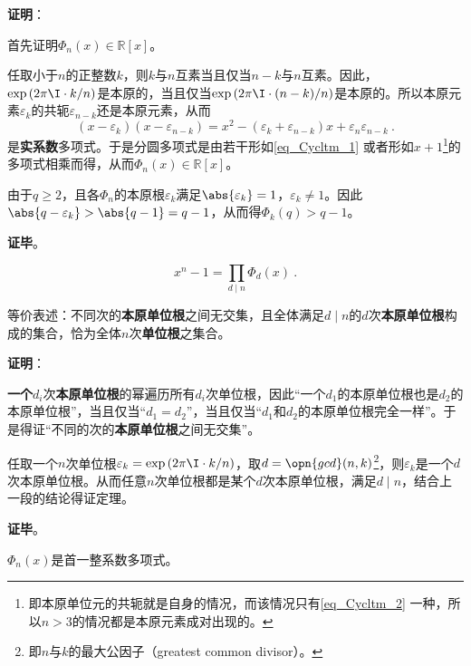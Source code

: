 \textbf{证明}：

首先证明$\Phi_n(x)\in\mathbb{R}[x]$。

任取小于$n$的正整数$k$，则$k$与$n$互素当且仅当$n-k$与$n$互素。因此，$\exp{(2\pi\I\cdot  k/n)}$是本原的，当且仅当$\exp{(2\pi\I\cdot  (n-k)/n)}$是本原的。所以本原元素$\varepsilon_k$的共轭$\varepsilon_{n-k}$还是本原元素，从而
\begin{equation}\label{eq_Cycltm_1}
(x-\varepsilon_k)(x-\varepsilon_{n-k})=x^2-(\varepsilon_k+\varepsilon_{n-k})x+\varepsilon_n\varepsilon_{n-k}~.
\end{equation}
是\textbf{实系数}多项式。于是分圆多项式是由若干形如\autoref{eq_Cycltm_1} 或者形如$x+1$\footnote{即本原单位元的共轭就是自身的情况，而该情况只有\autoref{eq_Cycltm_2} 一种，所以$n>3$的情况都是本原元素成对出现的。}的多项式相乘而得，从而$\Phi_n(x)\in\mathbb{R}[x]$。

由于$q\geq 2$，且各$\Phi_n$的本原根$\varepsilon_k$满足$\abs{\varepsilon_k}=1$，$\varepsilon_k\neq 1$。因此$\abs{q-\varepsilon_k}>\abs{q-1}=q-1$，从而得$\Phi_k(q)>q-1$。


\textbf{证毕}。




\begin{theorem}{}\label{the_Cycltm_1}
\begin{equation}
x^n-1 = \prod_{d\mid n}\Phi_d(x)~.
\end{equation}

等价表述：不同次的\textbf{本原单位根}之间无交集，且全体满足$d\mid n$的$d$次\textbf{本原单位根}构成的集合，恰为全体$n$次\textbf{单位根}之集合。
\end{theorem}

\textbf{证明}：

\textbf{一个}$d_i$次\textbf{本原单位根}的幂遍历所有$d_i$次单位根，因此“一个$d_1$的本原单位根也是$d_2$的本原单位根”，当且仅当“$d_1=d_2$”，当且仅当“$d_1$和$d_2$的本原单位根完全一样”。于是得证“不同的次的\textbf{本原单位根}之间无交集”。

任取一个$n$次单位根$\varepsilon_k=\exp{(2\pi\I\cdot  k/n)}$，取$d=\opn{gcd}(n, k)$\footnote{即$n$与$k$的最大公因子（greatest common divisor）。}，则$\varepsilon_k$是一个$d$次本原单位根。从而任意$n$次单位根都是某个$d$次本原单位根，满足$d\mid n$，结合上一段的结论得证定理。

\textbf{证毕}。



\begin{theorem}{}\label{the_Cycltm_2}
$\Phi_n(x)$是首一整系数多项式。
\end{theorem}

